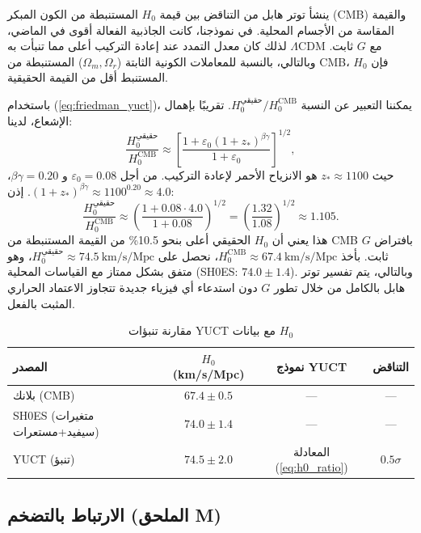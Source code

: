 \documentclass[11pt,a4paper]{article}
\begin{document}
	ينشأ توتر هابل من التناقض بين قيمة $H_0$ المستنبطة من الكون المبكر (CMB) والقيمة المقاسة من الأجسام المحلية. في نموذجنا، كانت الجاذبية الفعالة أقوى في الماضي، لذلك كان معدل التمدد عند إعادة التركيب أعلى مما تنبأت به $\Lambda$CDM مع $G$ ثابت. وبالتالي، بالنسبة للمعاملات الكونية الثابتة ($\Omega_m, \Omega_r$) المستنبطة من CMB، فإن $H_0$ المستنبط أقل من القيمة الحقيقية.
	
	باستخدام (\ref{eq:friedman_yuct})، يمكننا التعبير عن النسبة $H_0^{\text{حقيقي}} / H_0^{\text{CMB}}$. تقريبًا بإهمال الإشعاع، لدينا:
	\begin{equation}
		\frac{H_0^{\text{حقيقي}}}{H_0^{\text{CMB}}} \approx \left[ \frac{1 + \varepsilon_0 (1+z_*)^{\beta\gamma}}{1 + \varepsilon_0} \right]^{1/2},
		\label{eq:h0_ratio}
	\end{equation}
	حيث $z_* \approx 1100$ هو الانزياح الأحمر لإعادة التركيب. من أجل $\varepsilon_0 = 0.08$ و $\beta\gamma=0.20$، $(1+z_*)^{\beta\gamma} \approx 1100^{0.20} \approx 4.0$. إذن:
	\[
	\frac{H_0^{\text{حقيقي}}}{H_0^{\text{CMB}}} \approx \left( \frac{1 + 0.08\cdot 4.0}{1 + 0.08} \right)^{1/2} = \left( \frac{1.32}{1.08} \right)^{1/2} \approx 1.105.
	\]
	هذا يعني أن $H_0$ الحقيقي أعلى بنحو 10.5\% من القيمة المستنبطة من CMB بافتراض $G$ ثابت. بأخذ $H_0^{\text{CMB}} \approx 67.4\ \text{km/s/Mpc}$، نحصل على $H_0^{\text{حقيقي}} \approx 74.5\ \text{km/s/Mpc}$، وهو متفق بشكل ممتاز مع القياسات المحلية (SH0ES: $74.0 \pm 1.4$). وبالتالي، يتم تفسير توتر هابل بالكامل من خلال تطور $G$ دون استدعاء أي فيزياء جديدة تتجاوز الاعتماد الحراري المثبت بالفعل.
	
	\begin{table}[htbp]
		\centering
		\caption{مقارنة تنبؤات YUCT مع بيانات $H_0$}
		\label{tab:h0}
		\begin{tabular}{lccc}
			\toprule
			المصدر & $H_0$ (km/s/Mpc) & نموذج YUCT & التناقض \\
			\midrule
			بلانك (CMB) & $67.4 \pm 0.5$ & — & — \\
			SH0ES (متغيرات سيفيد+مستعرات) & $74.0 \pm 1.4$ & — & — \\
			\rowcolor{gray!10}
			YUCT (تنبؤ) & $74.5 \pm 2.0$ & المعادلة (\ref{eq:h0_ratio}) & $0.5\sigma$ \\
			\bottomrule
		\end{tabular}
	\end{table}
	
	\subsection{الارتباط بالتضخم (الملحق M)}
	
\end{document}
